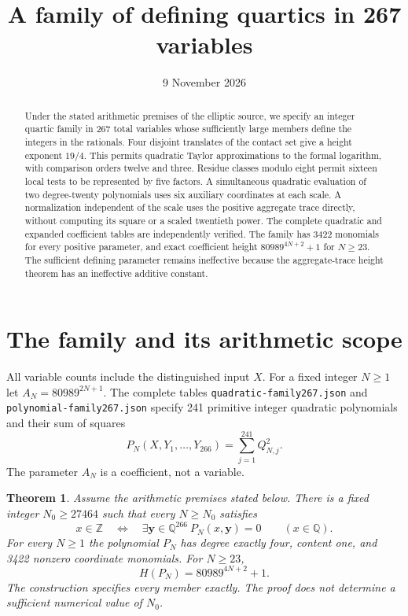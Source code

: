 \documentclass[11pt,a4paper]{article}
\title{A family of defining quartics in 267 variables}
\author{}\date{9 November 2026}
\newtheorem{theorem}{Theorem}[section]\newtheorem{lemma}[theorem]{Lemma}
\newcommand{\Q}{\mathbb Q}\newcommand{\Z}{\mathbb Z}\newcommand{\HH}{\mathcal H}
\begin{document}
\maketitle
\begin{abstract}
Under the stated arithmetic premises of the elliptic source, we specify
an integer quartic family in 267 total variables whose sufficiently
large members define the integers in the rationals. Four disjoint
translates of the contact set give a height exponent $19/4$. This permits
quadratic Taylor approximations to the formal logarithm, with comparison
orders twelve and three. Residue classes modulo eight permit sixteen local tests to be represented
by five factors. A simultaneous quadratic evaluation of two degree-twenty
polynomials uses six auxiliary coordinates at each scale. A normalization
independent of the scale uses the positive aggregate trace directly,
without computing its square or a scaled twentieth power. The complete
quadratic and expanded coefficient tables are independently verified.
The family has 3422 monomials for every positive parameter, and exact
coefficient height $80989^{4N+2}+1$ for $N\ge23$. The sufficient defining
parameter remains ineffective because the aggregate-trace height theorem
has an ineffective additive constant.
\end{abstract}

\section{The family and its arithmetic scope}
All variable counts include the distinguished input $X$. For a fixed
integer $N\ge1$ let $A_N=80989^{2N+1}$. The complete tables
\nolinkurl{quadratic-family267.json} and
\nolinkurl{polynomial-family267.json} specify 241 primitive integer
quadratic polynomials and their sum of squares
\[
 P_N(X,Y_1,\ldots,Y_{266})=\sum_{j=1}^{241}Q_{N,j}^2.
\]
The parameter $A_N$ is a coefficient, not a variable.

\begin{theorem}\label{thm:main}
Assume the arithmetic premises stated below. There is a fixed integer
$N_0\ge27464$ such that every $N\ge N_0$ satisfies
\[
 x\in\Z\quad\Longleftrightarrow\quad
 \exists\mathbf y\in\Q^{266}\ P_N(x,\mathbf y)=0
 \qquad(x\in\Q).
\]
For every $N\ge1$ the polynomial $P_N$ has degree exactly four,
content one, and 3422 nonzero coordinate monomials. For $N\ge23$,
\[
                       H(P_N)=80989^{4N+2}+1.
\]
The construction specifies every member exactly. The proof does not
determine a sufficient numerical value of $N_0$.
\end{theorem}
\end{document}
